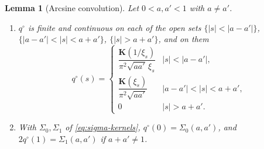 \documentclass[preprint,12pt,a4paper]{elsarticle}
\newtheorem{lemma}[theorem]{Lemma}
\theoremstyle{remark}
\begin{document}
\begin{lemma}[Arcsine convolution]\label{lem:arcsine}
Let $0<a,a'<1$ with $a\ne a'$.
\begin{enumerate}
\item[(i)] $q^\circ$ is finite and continuous on each of the open sets
 $\{|s|<|a-a'|\}$, $\{|a-a'|<|s|<a+a'\}$, $\{|s|>a+a'\}$, and on them
 \[
  q^\circ(s)=\begin{cases}
  \dfrac{\mathbf K(1/\xi_s)}{\pi^2\sqrt{aa'}\,\xi_s}&|s|<|a-a'|,\\[2ex]
  \dfrac{\mathbf K(\xi_s)}{\pi^2\sqrt{aa'}}&|a-a'|<|s|<a+a',\\[1ex]
  0&|s|>a+a'.\end{cases}
 \]
\item[(ii)] With $\Sigma_0,\Sigma_1$ of \eqref{eq:sigma-kernels},
 $q^\circ(0)=\Sigma_0(a,a')$, and $2q^\circ(1)=\Sigma_1(a,a')$ if $a+a'\ne1$.
\end{enumerate}
\end{lemma}
\end{document}
